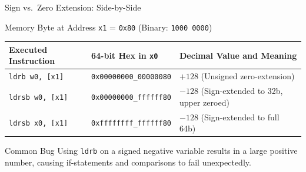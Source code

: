 \documentclass[aspectratio=169,11pt,t]{beamer}
\newcommand{\hex}[1]{\texttt{0x#1}}
\newcommand{\code}[1]{\texttt{#1}}
\begin{document}
\begin{frame}{Sign vs.\ Zero Extension: Side-by-Side}
\begin{block}{Memory Byte at Address \texttt{x1} = \hex{80} (Binary: \texttt{1000 0000})}
\end{block}

\vspace{0.15cm}
\begin{center}
\footnotesize
\setlength{\tabcolsep}{6pt}
\begin{tabular}{ll>{\raggedright\arraybackslash}p{5.5cm}}
\toprule
\textbf{Executed Instruction} & \textbf{64-bit Hex in \texttt{x0}} & \textbf{Decimal Value and Meaning} \\
\midrule
\code{ldrb  w0, [x1]} & \texttt{0x00000000\_00000080} & $+128$ (Unsigned zero-extension) \\[0.3em]
\code{ldrsb w0, [x1]} & \texttt{0x00000000\_ffffff80} & $-128$ (Sign-extended to 32b, upper zeroed) \\[0.3em]
\code{ldrsb x0, [x1]} & \texttt{0xffffffff\_ffffff80} & $-128$ (Sign-extended to full 64b) \\
\bottomrule
\end{tabular}
\end{center}

\vspace{0.25cm}
\normalsize
\begin{block}{Common Bug}
Using \code{ldrb} on a signed negative variable results in a large positive number, causing if-statements and comparisons to fail unexpectedly.
\end{block}
\end{frame}

\end{document}
